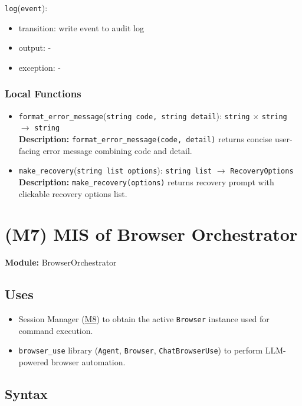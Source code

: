 \documentclass[12pt, titlepage]{article}
\begin{document}
\noindent \texttt{log}(\texttt{event}):
\begin{itemize}
\item transition: write event to audit log
\item output: -
\item exception: -
\end{itemize}

\subsubsection{Local Functions}
\begin{itemize}
  \item \texttt{format\_error\_message}(\texttt{string code, string detail}): \texttt{string} $\times$ \texttt{string} $\rightarrow$ \texttt{string} \\
  \textbf{Description:} \texttt{format\_error\_message(code, detail)} returns concise user-facing error message combining code and detail.

  \item \texttt{make\_recovery}(\texttt{string list options}): \texttt{string list} $\rightarrow$ \texttt{RecoveryOptions} \\
  \textbf{Description:} \texttt{make\_recovery(options)} returns recovery prompt with clickable recovery options list.
\end{itemize}

\section{(M7) MIS of Browser Orchestrator}
\label{M7}
\textbf{Module:} BrowserOrchestrator

\subsection{Uses}
\begin{itemize}
  \item Session Manager (\hyperref[M8]{M8}) to obtain the active \texttt{Browser} instance used for command execution.
  \item \texttt{browser\_use} library (\texttt{Agent}, \texttt{Browser}, \texttt{ChatBrowserUse}) to perform LLM-powered browser automation.
\end{itemize}

\subsection{Syntax}
\end{document}
